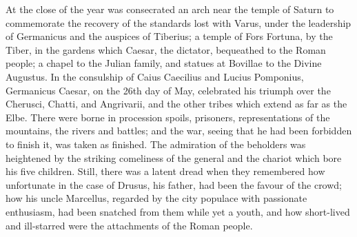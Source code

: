 
At the close of the year was consecrated an arch near the temple of Saturn to commemorate the recovery of the standards lost with Varus, under the leadership of Germanicus and the auspices of Tiberius; a temple of Fors Fortuna, by the Tiber, in the gardens which Caesar, the dictator, bequeathed to the Roman people; a chapel to the Julian family, and statues at Bovillae to the Divine Augustus. In the consulship of Caius Caecilius and Lucius Pomponius, Germanicus Caesar, on the 26th day of May, celebrated his triumph over the Cherusci, Chatti, and Angrivarii, and the other tribes which extend as far as the Elbe. There were borne in procession spoils, prisoners, representations of the mountains, the rivers and battles; and the war, seeing that he had been forbidden to finish it, was taken as finished. The admiration of the beholders was heightened by the striking comeliness of the general and the chariot which bore his five children. Still, there was a latent dread when they remembered how unfortunate in the case of Drusus, his father, had been the favour of the crowd; how his uncle Marcellus, regarded by the city populace with passionate enthusiasm, had been snatched from them while yet a youth, and how short-lived and ill-starred were the attachments of the Roman people.


